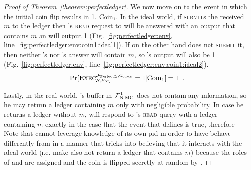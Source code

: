 \begin{proof}[Proof of Theorem~\ref{theorem:perfectledger}]
    We now move on to the event in which the initial coin flip results in 1,
    $\mathrm{Coin}_1$. In the ideal world, if \simulator{} \textsc{submit}s the
    received $m$ to the ledger then \environment's \textsc{read} request to
    \bob{} will be answered with an output that contains $m$ an \environment{}
    will output 1 (Fig.~\ref{fig:perfectledger:env},
    line~\ref{fig:perfectledger:env:coin1:ideal1}). If on the other hand
    \simulator{} does not \textsc{submit} it, then neither \bob's nor \alice's
    answer will contain $m$, so \environment's output will also be 1
    (Fig.~\ref{fig:perfectledger:env},
    line~\ref{fig:perfectledger:env:coin1:ideal2}).
    \begin{equation*}
      \Pr[\textsc{Exec}^{\mathcal{F}_{\mathrm{PerfectL}}, \bar{\mathcal{G}}_{\textsc{clock}}}_{\mathcal{S}, \mathcal{E}_{\mathrm{PL}}} = 1
      | \mathrm{Coin}_1] = 1 \enspace.
    \end{equation*}

    Lastly, in the real world, \bob's buffer in $\mathcal{F}_{\textsc{N-MC}}^1$ does not
    contain any information, so he may return a ledger containing $m$ only with
    negligible probability. In case he returns a ledger without $m$, \alice{}
    will respond to \environment's \textsc{read} query with a ledger containing
    $m$ exactly in the case that the event that defines \ppfetches{} is true,
    therefore
    Note that \perfectprot{} cannot leverage knowledge of its own pid in order
    to have \alice{} behave differently from \bob{} in a manner that tricks
    \perfectenv{} into believing that it interacts with the ideal world (i.e.
    make \alice{} also not return a ledger that contains $m$) because the roles
    of \alice{} and \bob{} are assigned and the coin is flipped secretly at
    random by \perfectenv.


\end{proof}
